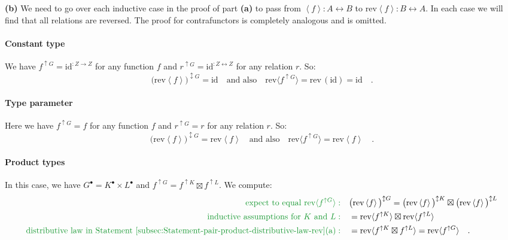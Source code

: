 \textbf{(b)} We need to go over each inductive case in the proof of
part \textbf{(a)} to pass from $\left<f\right>:A\leftrightarrow B$
to $\text{rev}\left<f\right>:B\leftrightarrow A$. In each case we
will find that all relations are reversed. The proof for contrafunctors
is completely analogous and is omitted.

\paragraph{Constant type}

We have $f^{\uparrow G}=\text{id}^{:Z\rightarrow Z}$ for any function
$f$ and $r^{\uparrow G}=\text{id}^{:Z\leftrightarrow Z}$ for any
relation $r$. So:
\[
\big(\text{rev}\left<f\right>\big)^{\updownarrow G}=\text{id}\quad\text{and also}\quad\text{rev}\langle f^{\uparrow G}\rangle=\text{rev}\,(\text{id})=\text{id}\quad.
\]


\paragraph{Type parameter}

Here we have $f^{\uparrow G}=f$ for any function $f$ and $r^{\uparrow G}=r$
for any relation $r$. So:
\[
\big(\text{rev}\left<f\right>\big)^{\updownarrow G}=\text{rev}\left<f\right>\quad\text{and also}\quad\text{rev}\langle f^{\uparrow G}\rangle=\text{rev}\left<f\right>\quad.
\]


\paragraph{Product types}

In this case, we have $G^{\bullet}=K^{\bullet}\times L^{\bullet}$
and $f^{\uparrow G}=f^{\uparrow K}\boxtimes f^{\uparrow L}$. We compute:
\begin{align*}
{\color{greenunder}\text{expect to equal }\text{rev}\langle f^{\uparrow G}\rangle:}\quad & \big(\text{rev}\left<f\right>\big)^{\updownarrow G}=\big(\text{rev}\left<f\right>\big)^{\updownarrow K}\boxtimes\big(\text{rev}\left<f\right>\big)^{\updownarrow L}\\
{\color{greenunder}\text{inductive assumptions for }K\text{ and }L:}\quad & =\text{rev}\langle f^{\uparrow K}\rangle\boxtimes\text{rev}\langle f^{\uparrow L}\rangle\\
{\color{greenunder}\text{distributive law in Statement~\ref{subsec:Statement-pair-product-distributive-law-rev}(a)}:}\quad & =\text{rev}\langle f^{\uparrow K}\boxtimes f^{\uparrow L}\rangle=\text{rev}\langle f^{\uparrow G}\rangle\quad.
\end{align*}


